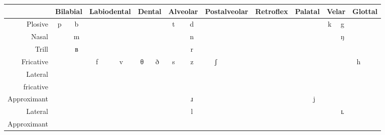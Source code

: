 \documentclass[oneside]{book}
\begin{document}
\begin{center}
\newcommand{\head}{\fontsize{7pt}{7pt}\selectfont}
\begin{tabular}{|r|cc|cc|cccccc|cc|cc|cc|cc|}\hline
&
\multicolumn{2}{|c|}{\head Bilabial}&
\multicolumn{2}{|c|}{\head Labiodental}&
\multicolumn{2}{|c|}{\head Dental}&
\multicolumn{2}{|c|}{\head Alveolar}&
\multicolumn{2}{|c|}{\head Postalveolar}&
\multicolumn{2}{|c|}{\head Retroflex}&
\multicolumn{2}{|c|}{\head Palatal}&
\multicolumn{2}{|c|}{\head Velar}&
\multicolumn{2}{|c|}{\head Glottal}\\\hline
\multirow{2}{*}{\head Plosive}&
\multirow{2}{*}{p}&
\multirow{2}{*}{b}&
&
&
&
&
\multirow{2}{*}{t}&
\multirow{2}{*}{d}&
&
&
&
&
&
&
\multirow{2}{*}{k}&
\multirow{2}{*}{g}&
&
\cellcolor{gray}\\
&&&&&&&&&&&&&&&&&&\cellcolor{gray}\\\hline
\multirow{2}{*}{\head Nasal}&
&
\multirow{2}{*}{m}&
&
&
&
&
&
\multirow{2}{*}{n}&
&
&
&
&
&
&
&
\multirow{2}{*}{ŋ}&
\cellcolor{gray}&
\cellcolor{gray}\\
&&&&&&&&&&&&&&&&&\cellcolor{gray}&\cellcolor{gray}\\\hline
\multirow{2}{*}{\head Trill}&
&
\multirow{2}{*}{ʙ}&
&
&
&
&
&
\multirow{2}{*}{r}&
&
&
&
&
&
&
\cellcolor{gray}&
\cellcolor{gray}&
\cellcolor{gray}&
\cellcolor{gray}\\
&&&&&&&&&&&&&&&\cellcolor{gray}&\cellcolor{gray}&\cellcolor{gray}&\cellcolor{gray}\\\hline
\multirow{2}{*}{\head Fricative}&
&
&
\multirow{2}{*}{f}&
\multirow{2}{*}{v}&
\multirow{2}{*}{θ}&
\multicolumn{1}{c|}{\multirow{2}{*}{ð}}&
\multicolumn{1}{c}{\multirow{2}{*}{s}}&
\multicolumn{1}{c|}{\multirow{2}{*}{z}}&
\multicolumn{1}{|c}{\multirow{2}{*}{ʃ}}&
&
&
&
&
&
&
&
\multirow{2}{*}{h}&
\\
&&&&&\multicolumn{2}{c|}{}&\multicolumn{2}{c|}{}&\multicolumn{2}{|c|}{}&&&&&&&&\\\hline
{\head Lateral}&
\cellcolor{gray}&
\cellcolor{gray}&
\cellcolor{gray}&
\cellcolor{gray}&
&
&
&
&
&
&
&
&
&
&
&
&
\cellcolor{gray}&
\cellcolor{gray}\\
{\head fricative}&\cellcolor{gray}&\cellcolor{gray}&\cellcolor{gray}&\cellcolor{gray}&&&&&&&&&&&&&\cellcolor{gray}&\cellcolor{gray}\\\hline
\multirow{2}{*}{\head Approximant}&
&
&
&
&
&
&
&
\multirow{2}{*}{ɹ}&
&
&
&
&
&
\multirow{2}{*}{j}&
&
&
\cellcolor{gray}&
\cellcolor{gray}\\
&&&&&&&&&&&&&&&&&\cellcolor{gray}&\cellcolor{gray}\\\hline
{\head Lateral}&
\cellcolor{gray}&
\cellcolor{gray}&
\cellcolor{gray}&
\cellcolor{gray}&
&
&
&
\multirow{2}{*}{l}&
&
&
&
&
&
&
&
\multirow{2}{*}{ʟ}&
\cellcolor{gray}&
\cellcolor{gray}\\
{\head Approximant}&\cellcolor{gray}&\cellcolor{gray}&\cellcolor{gray}&\cellcolor{gray}&&&&&&&&&&&&&\cellcolor{gray}&\cellcolor{gray}\\\hline
\end{tabular}
\end{center}
\end{document}
